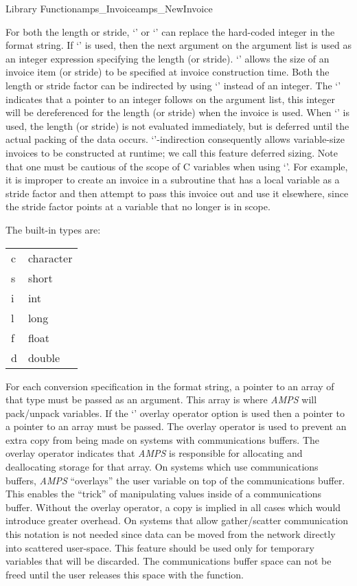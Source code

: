 \begin{deftypefn}{Library Function}{amps_Invoice}{amps\_NewInvoice}
{For both the length or stride, `\code{*}' or `\code{&}' can replace
the hard-coded integer in the format string.  If `\code{*}' is used,
then the next argument on the argument list is used as an integer
expression specifying the length (or stride).  `\code{*}' allows the
size of an invoice item (or stride) to be specified at invoice
construction time.  Both the length or stride factor can be indirected
by using `\code{&}' instead of an integer.  The `\code{&}' indicates
that a pointer to an integer follows on the argument list, this
integer will be dereferenced for the length (or stride) when the
invoice is used.  When `\code{&}' is used, the length (or stride) is
not evaluated immediately, but is deferred until the actual packing of
the data occurs.  `\code{&}'-indirection consequently allows
variable-size invoices to be constructed at runtime; we call this
feature deferred sizing.  Note that one must be cautious of the scope
of C variables when using `\code{&}'.  For example, it is improper to
create an invoice in a subroutine that has a local variable as a
stride factor and then attempt to pass this invoice out and use it
elsewhere, since the stride factor points at a variable that no longer
is in scope.

The built-in types are: 

\begin{tabular}{ll}
c & character \\
s & short \\
i & int \\
l & long \\
f & float \\
d & double
\end{tabular}

For each conversion specification in the format string, a pointer to an
array of that type must be passed as an argument.  This array is where
{\em AMPS} will pack/unpack variables.  If the `' overlay
operator option is used then a pointer to a pointer to an array must be
passed.  The overlay operator is used to prevent an extra copy from
being made on systems with communications buffers.  The overlay operator
indicates that {\em AMPS} is responsible for allocating and
deallocating storage for that array.  On systems which use
communications buffers, {\em AMPS} ``overlays'' the user variable on
top of the communications buffer.  This enables the ``trick'' of
manipulating values inside of a communications buffer.  Without the
overlay operator, a copy is implied in all cases which would introduce
greater overhead.  On systems that allow gather/scatter communication
this notation is not needed since data can be moved from the network
directly into scattered user-space.  This feature should be used only
for temporary variables that will be discarded.  The communications
buffer space can not be freed until the user releases this space with
the  function.

}
\end{deftypefn}
